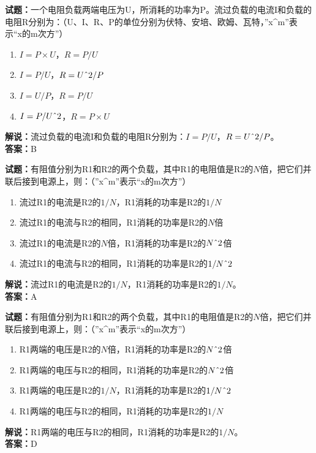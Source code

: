 \documentclass{ctexbook}
\begin{document}
\vspace{1em}

\textbf{试题：}一个电阻负载两端电压为U，所消耗的功率为P。流过负载的电流I和负载的电阻R分别为：（U、I、R、P的单位分别为伏特、安培、欧姆、瓦特，”x\string^m”表示“x的m次方”）
\begin{enumerate}[leftmargin=3em]
  \item \(I = P\times U\)，\(R = P/U\)
  \item \(I = P/U\)，\(R = U\string^2/P\)
  \item \(I = U/P\)，\(R = P/U\)
  \item \(I = P/ U\string^2\)，\(R = P\times U\)
\end{enumerate}
\noindent\textbf{解说：}流过负载的电流I和负载的电阻R分别为：\(I = P/U\)，\(R = U\string^2/P\)。\\\noindent\textbf{答案：}B

\vspace{1em}

\textbf{试题：}有阻值分别为R1和R2的两个负载，其中R1的电阻值是R2的\(N\)倍，把它们并联后接到电源上，则：（”x\string^m”表示“x的m次方”）
\begin{enumerate}[leftmargin=3em]
  \item 流过R1的电流是R2的\(1/N\)，R1消耗的功率是R2的\(1/N\)
  \item 流过R1的电流与R2的相同，R1消耗的功率是R2的\(N\)倍
  \item 流过R1的电流是R2的\(N\)倍，R1消耗的功率是R2的\(N\string^2\)倍
  \item 流过R1的电流与R2的相同，R1消耗的功率是R2的\(1/N\string^2\)
\end{enumerate}
\noindent\textbf{解说：}流过R1的电流是R2的\(1/N\)，R1消耗的功率是R2的\(1/N\)。\\
\noindent\textbf{答案：}A

\vspace{1em}

\textbf{试题：}有阻值分别为R1和R2的两个负载，其中R1的电阻值是R2的\(N\)倍，把它们并联后接到电源上，则：（”x\string^m”表示“x的m次方”）
\begin{enumerate}[leftmargin=3em]
  \item R1两端的电压是R2的\(N\)倍，R1消耗的功率是R2的\(N\string^2\)倍
  \item R1两端的电压与R2的相同，R1消耗的功率是R2的\(N\string^2\)倍
  \item R1两端的电压是R2的\(1/N\)，R1消耗的功率是R2的\(1/N\string^2\)
  \item R1两端的电压与R2的相同，R1消耗的功率是R2的\(1/N\)
\end{enumerate}
\noindent\textbf{解说：}R1两端的电压与R2的相同，R1消耗的功率是R2的\(1/N\)。\\
\noindent\textbf{答案：}D
\end{document}
